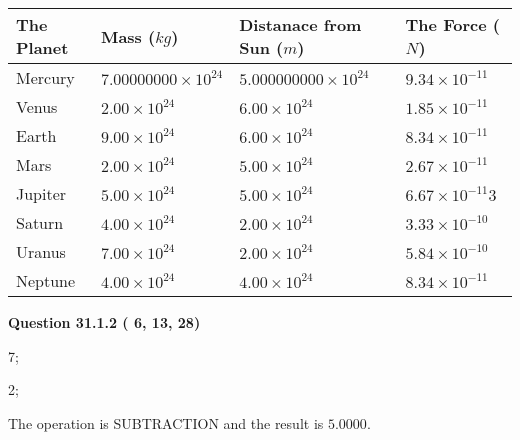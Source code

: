 \documentclass[12pt]{article}
\begin{document}
 
\begin{tabular}{|l|l|l|l|}
\hline
The Planet & Mass ($kg$) & Distanace from Sun ($m$) & The Force ($N$)\\
\hline
Mercury  &
           $ %
7.00000000 \times 10^{24}  $   &
             $ %
5.000000000 \times 10^{24}$    & $ %
9.34 \times 10^{-11} $
\\  \hline
Venus    &
           $  %
2.00 \times 10^{24}  $     &
             $ %
6.00 \times 10^{24} $    & $ %
1.85 \times 10^{-11} $
\\  \hline
Earth    &
           $  %
9.00 \times 10^{24}$     &
             $ %
6.00 \times 10^{24} $    & $ %
8.34 \times 10^{-11} $
\\   \hline
Mars     &
           $  %
2.00 \times 10^{24} $     &
             $ %
5.00 \times 10^{24}$    & $ %
2.67 \times 10^{-11} $
\\   \hline
Jupiter  &
           $  %
5.00 \times 10^{24}  $    &
             $ %
5.00 \times 10^{24} $    & $ %
6.67 \times 10^{-11}3 $
\\  \hline
Saturn   &
           $  %
4.00 \times 10^{24}   $    &
             $ %
2.00 \times 10^{24}  $    & $ %
3.33 \times 10^{-10} $
\\  \hline
Uranus   &
           $  %
7.00 \times 10^{24} $    &
             $ %
2.00 \times 10^{24}$    & $ %
5.84 \times 10^{-10} $
\\  \hline
Neptune  &
           $  %
4.00 \times 10^{24}  $    &
             $ %
4.00 \times 10^{24} $    & $ %
8.34 \times 10^{-11} $
\\  \hline
 
\end{tabular}
 
 
 
 
  
\vspace{0.2in}
  
{\textbf{\Large{Question
31.1.2 
 (          6,         13,         28)
}}}
  
  
 
 
\noindent{}

7;
 
2;
 
The operation is  %
SUBTRACTION and the result is
$ %
5.0000$.
 
 
 
  
\vspace{0.2in}
  
\end{document}
